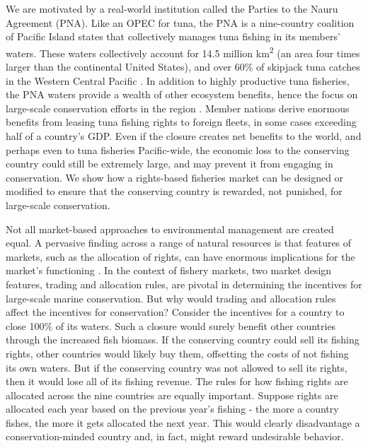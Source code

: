 \documentclass[12pt]{article}
\begin{document}
We are motivated by a real-world institution called the Parties to the Nauru Agreement (PNA). Like an OPEC for tuna, the PNA is a nine-country coalition of Pacific Island states that collectively manages tuna fishing in its members' waters\cite{havice_2013,aqorau_2018}. These waters collectively account for 14.5 million km\textsuperscript{2} (an area four times larger than the continental United States), and over 60\% of skipjack tuna catches in the Western Central Pacific \cite{havice_2013}. In addition to highly productive tuna fisheries, the PNA waters provide a wealth of other ecosystem benefits, hence the focus on large-scale conservation efforts in the region \cite{mcleod_2019}. Member nations derive enormous benefits from leasing tuna fishing rights to foreign fleets, in some cases exceeding half of a country's GDP. Even if the closure creates net benefits to the world, and perhaps even to tuna fisheries Pacific-wide, the economic loss to the conserving country could still be extremely large, and may prevent it from engaging in conservation. We show how a rights-based fisheries market can be designed or modified  to ensure that the conserving country is rewarded, not punished, for large-scale conservation.

Not all market-based approaches to environmental management are created equal. A pervasive finding across a range of natural resources is that features of markets, such as the allocation of rights, can have enormous implications for the market's functioning \cite{libecap_1989}. In the context of fishery markets, two market design features, trading and allocation rules, are pivotal in determining the incentives for large-scale marine conservation. But why would trading and allocation rules affect the incentives for conservation? Consider the incentives for a country to close 100\% of its waters. Such a closure would surely benefit other countries through the increased fish biomass. If the conserving country could sell its fishing rights, other countries would likely buy them, offsetting the costs of not fishing its own waters. But if the conserving country was not allowed to sell its rights, then it would lose all of its fishing revenue. The rules for how fishing rights are allocated across the nine countries are equally important. Suppose rights are allocated each year based on the previous year's fishing - the more a country fishes, the more it gets allocated the next year. This would clearly disadvantage a conservation-minded country and, in fact, might reward undesirable behavior.
\end{document}
